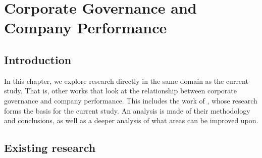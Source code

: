 \section{Corporate Governance and Company Performance}
\subsection{Introduction}
{In this chapter, we explore research directly in the same domain as the current study. That is, other works that look at the relationship between corporate governance and company performance. This includes the work of \cite{moldovan2015learning}, whose research forms the basis for the current study. An analysis is made of their methodology and conclusions, as well as a deeper analysis of what areas can be improved upon.}
\subsection{Existing research}
